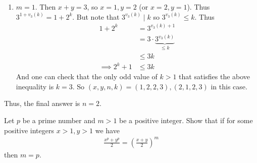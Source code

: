 \documentclass[main.tex]{subfile}
\begin{document}
\begin{solution}
\begin{enumerate}
                \item $m=1$. Then $x+y=3$, so $x=1, y=2$ (or $x=2, y=1$). Thus $3^{1+v_3(k)}= 1+2^k$. But note that
                $3^{v_3(k)} \mid k$ so $3^{v_3(k)} \leq k$. Thus
                	\begin{align*}
                		1+2^k
                			& = 3^{v_3(k)+1}\\
                			& = 3 \cdot \underbrace{3^{v_3(k)}}_{\leq k}\\
                			& \leq 3k\\
                		\implies 2^k +1
                			& \leq 3k
                	\end{align*}
                And one can check that the only odd value of $k>1$ that satisfies the above inequality is $k=3$. So $(x,y,n,k)=(1,2,2,3), (2,1,2,3)$ in this case.
            \end{enumerate}
    Thus, the final answer is $n=2.$

    \end{solution}

    \begin{problem}[Balkan 1993]
        Let $p$ be a prime number and $m>1$ be a positive integer. Show that if for some positive integers $x>1, y>1$ we have
        \begin{align*}
	        \frac{x^p+y^p}{2}= \left( \frac{x+y}{2} \right)^m
        \end{align*}
        then $m=p.$
    \end{problem}
\end{document}

